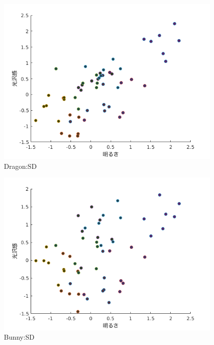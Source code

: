     \newpage
    \begin{figure}[h]
        \centering
        \includegraphics[width=12.0cm]{./img/ex3_DSD.png}
        \caption{Dragon:SD}
        \label{ex3_DSD}
    \end{figure}

    \begin{figure}[h]
        \centering
        \includegraphics[width=12.0cm]{./img/ex3_BSD.png}
        \caption{Bunny:SD}
        \label{ex3_DSD}
    \end{figure}

